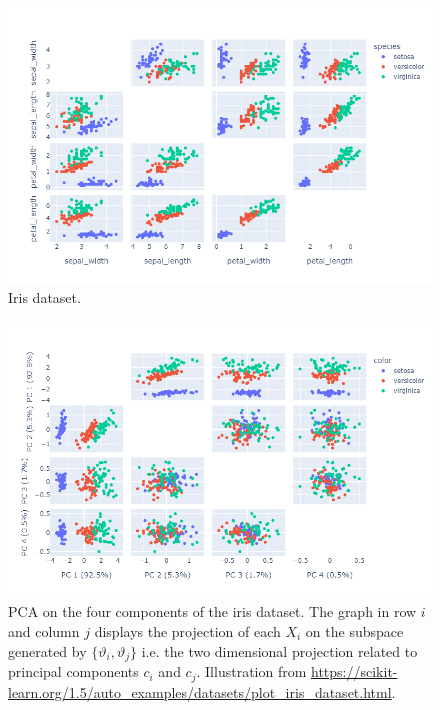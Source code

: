 \begin{figure}
        \centering
            \includegraphics[width=.9\textwidth]{./Illustrations/pca_iris}
        \caption{\small Iris dataset.} 
        \label{fig:pca:iris}
    \end{figure}

\begin{figure}
        \centering
            \includegraphics[width=.9\textwidth]{./Illustrations/pca_iris_proj}
        \caption{\small PCA on the four components of the iris dataset. The graph in row $i$ and column $j$ displays the projection of each $X_i$ on the subspace generated by $\{\vartheta_i,\vartheta_j\}$ i.e. the two dimensional projection related to principal components $c_i$ and $c_j$. Illustration from \url{https://scikit-learn.org/1.5/auto_examples/datasets/plot_iris_dataset.html}.} 
        \label{fig:pca:iris:proj}
    \end{figure}

